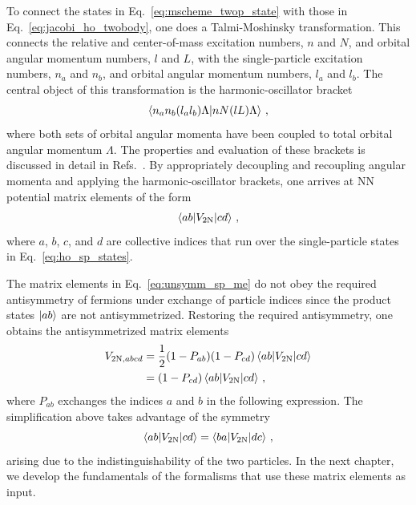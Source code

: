 To connect the states in Eq.~\ref{eq:mscheme_twop_state} with those in Eq.~\ref{eq:jacobi_ho_twobody},
one does a Talmi-Moshinsky transformation.
This connects the relative and center-of-mass excitation numbers, $n$ and $N$,
and orbital angular momentum numbers, $l$ and $L$,
with the single-particle excitation numbers, $n_a$ and $n_b$,
and orbital angular momentum numbers, $l_a$ and $l_b$.
The central object of this transformation is the harmonic-oscillator bracket
\begin{equation}
  \braket{n_a n_b (l_a l_b) \Lambda | n N (l L) \Lambda}\,,
\end{equation}
where both sets of orbital angular momenta have been coupled to total orbital angular momentum $\Lambda$.
The properties and evaluation of these brackets is discussed in detail in Refs.~\cite{Mosh59hobr,Buck96hobr}.
By appropriately decoupling and recoupling angular momenta
and applying the harmonic-oscillator brackets,
one arrives at NN potential matrix elements of the form
\begin{equation}\label{eq:unsymm_sp_me}
  \braket{ab | V_{2\text{N}} | cd}\,,
\end{equation}
where $a$, $b$, $c$, and $d$ are collective indices
that run over the single-particle states in Eq.~\ref{eq:ho_sp_states}.

The matrix elements in Eq.~\ref{eq:unsymm_sp_me}
do not obey the required antisymmetry of fermions under exchange of particle indices
since the product states $\ket{ab}$ are not antisymmetrized.
Restoring the required antisymmetry,
one obtains the antisymmetrized matrix elements
\begin{align}
  V_{2\text{N},abcd} &= \frac{1}{2}(1 - P_{ab})(1 - P_{cd})\braket{ab | V_{2\text{N}} | cd} \\
  &= (1 - P_{cd}) \braket{ab | V_{2\text{N}} | cd}\,,
\end{align}
where $P_{ab}$ exchanges the indices $a$ and $b$ in the following expression.
The simplification above takes advantage of the symmetry
\begin{equation}
  \braket{ab | V_{2\text{N}} | cd} = \braket{ba | V_{2\text{N}} | dc}\,,
\end{equation}
arising due to the indistinguishability of the two particles.
In the next chapter, we develop the fundamentals of the formalisms
that use these matrix elements as input.

